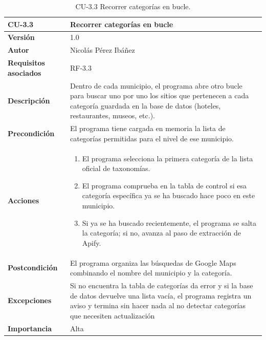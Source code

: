\begin{table}[p]
	\centering
	\begin{tabularx}{\linewidth}{ p{} p{} }
		\toprule
		\textbf{CU-3.3}  & \textbf{Recorrer categorías en bucle}\\
		\toprule
		\textbf{Versión}              & 1.0    \\
		\textbf{Autor}                & Nicolás Pérez Ibáñez \\
		\textbf{Requisitos asociados} & RF-3.3 \\
		\textbf{Descripción}          & Dentro de cada municipio, el programa abre otro bucle para buscar uno por uno los sitios que pertenecen a cada categoría guardada en la base de datos (hoteles, restaurantes, museos, etc.). \\
		\textbf{Precondición}         & El programa tiene cargada en memoria la lista de categorías permitidas para el nivel de ese municipio. \\
		\textbf{Acciones}             &
		\begin{enumerate}
			\def\labelenumi{\arabic{enumi}.}
			\tightlist
			\item El programa selecciona la primera categoría de la lista oficial de taxonomías.
			\item El programa comprueba en la tabla de control si esa categoría específica ya se ha buscado hace poco en este municipio.
			\item Si ya se ha buscado recientemente, el programa se salta la categoría; si no, avanza al paso de extracción de Apify.
		\end{enumerate}\\
		\textbf{Postcondición}        & El programa organiza las búsquedas de Google Maps combinando el nombre del municipio y la categoría. \\
		\textbf{Excepciones}          & Si no encuentra la tabla de categorías da error y si la base de datos devuelve una lista vacía, el programa registra un aviso y termina sin hacer nada al no detectar categorías que necesiten actualización \\
		\textbf{Importancia}          & Alta \\
		\bottomrule
	\end{tabularx}
	\caption{CU-3.3 Recorrer categorías en bucle.}
\end{table}

